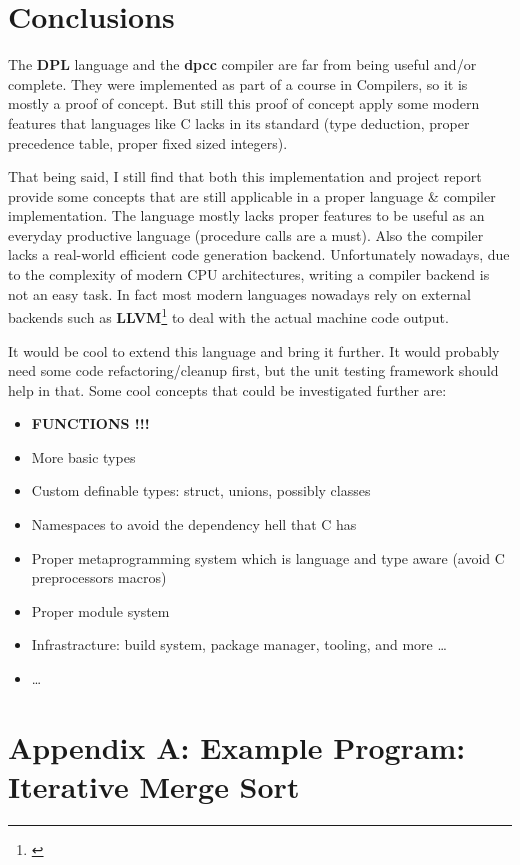 \documentclass[a4paper]{article}
\newcommand{\urlref}[3][blue]{\href{#2}{\color{#1}{#3}}}%
\begin{document}
\clearpage

\section{Conclusions}

The \textbf{DPL} language and the \textbf{dpcc} compiler are far from being useful and/or complete.
They were implemented as part of a course in Compilers, so it is mostly a proof of concept. But still
this proof of concept apply some modern features that languages
like C lacks in its standard (type deduction, proper precedence table, proper fixed sized integers).

That being said, I still find that both this implementation and project report provide some concepts that are still applicable in a proper language \& compiler implementation.
The language mostly lacks proper features to be useful as an everyday productive language (procedure calls are a must).
Also the compiler lacks a  real-world efficient code generation backend. Unfortunately nowadays, due to the complexity
of modern CPU architectures, writing a compiler backend is not an easy task. In fact most modern languages
nowadays rely on external backends such as \textbf{LLVM}\footnote{\urlref{https://llvm.org/}{LLVM Website}} to deal with the actual machine code output.

It would be cool to extend this language and bring it further. It would probably need some code refactoring/cleanup first,
but the unit testing framework should help in that. Some cool concepts that could be investigated further are:

\begin{itemize}
\item \textbf{FUNCTIONS !!!}
\item More basic types
\item Custom definable types: struct, unions, possibly classes
\item Namespaces to avoid the dependency hell that C has
\item Proper metaprogramming system which is language and type aware (avoid C preprocessors macros)
\item Proper module system
\item Infrastracture: build system, package manager, tooling, and more \dots
\item \dots
\end{itemize}

\clearpage
\section{Appendix A: Example Program: Iterative Merge Sort}
\label{appendix_a}
\end{document}
